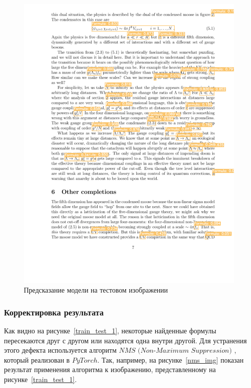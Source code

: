 \begin{figure}
    \includegraphics[scale=0.75]{img/train/test_2.png}
    \caption{Предсказание модели на тестовом изображении}
    \label{train_test_2}
\end{figure}

\subsubsection{Корректировка результата}
Как видно на рисунке~\ref{train_test_1}, некоторые найденные формулы пересекаются друг с другом или находятся одна внутри другой. Для устранения этого дефекта используется алгоритм $\textit{NMS (Non-Maximum Suppression)}$ \cite{nms}, который реализован в $PyTorch$.
Так, например, на рисунке~\ref{nms_img} показан результат применения алгоритма к изображению, представленному на рисунке~\ref{train_test_1}.

